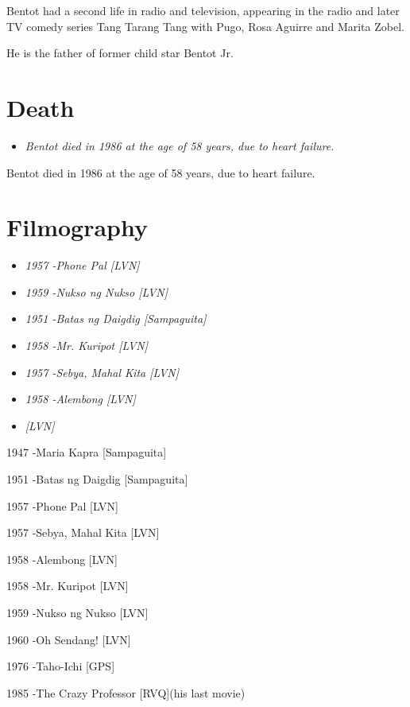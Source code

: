 Bentot had a second life in radio and television, appearing in the radio
and later TV comedy series Tang Tarang Tang with Pugo, Rosa Aguirre and
Marita Zobel.

He is the father of former child star Bentot Jr.

\section{Death}\label{death}

\begin{itemize}
\item
  \emph{Bentot died in 1986 at the age of 58 years, due to heart
  failure.}
\end{itemize}

Bentot died in 1986 at the age of 58 years, due to heart failure.

\section{Filmography}\label{filmography}

\begin{itemize}
\item
  \emph{1957 -Phone Pal {[}LVN{]}}
\item
  \emph{1959 -Nukso ng Nukso {[}LVN{]}}
\item
  \emph{1951 -Batas ng Daigdig {[}Sampaguita{]}}
\item
  \emph{1958 -Mr. Kuripot {[}LVN{]}}
\item
  \emph{1957 -Sebya, Mahal Kita {[}LVN{]}}
\item
  \emph{1958 -Alembong {[}LVN{]}}
\item
  \emph{{[}LVN{]}}
\end{itemize}

1947 -Maria Kapra {[}Sampaguita{]}

1951 -Batas ng Daigdig {[}Sampaguita{]}

1957 -Phone Pal {[}LVN{]}

1957 -Sebya, Mahal Kita {[}LVN{]}

1958 -Alembong {[}LVN{]}

1958 -Mr. Kuripot {[}LVN{]}

1959 -Nukso ng Nukso {[}LVN{]}

1960 -Oh Sendang! {[}LVN{]}

1976 -Taho-Ichi {[}GPS{]}

1985 -The Crazy Professor {[}RVQ{]}(his last movie)

